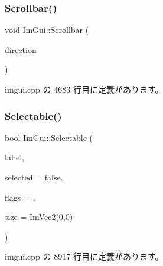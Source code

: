 \mbox{\label{namespace_im_gui_abf1d7a83c5f0a555bbe7f831b0319c8a}} 
\subsubsection{\texorpdfstring{Scrollbar()}{Scrollbar()}}
{\footnotesize\ttfamily void Im\+Gui\+::\+Scrollbar (\begin{DoxyParamCaption}\item[{\mbox{\hyperlink{imgui__internal_8h_a86d7bb2ee8297d38b131d8ea7e6430c6}{Im\+Gui\+Layout\+Type}}}]{direction }\end{DoxyParamCaption})}



 imgui.\+cpp の 4683 行目に定義があります。

\mbox{\label{namespace_im_gui_af98575238bda183a523df19fb447af60}} 
\subsubsection{\texorpdfstring{Selectable()}{Selectable()}\hspace{0.1cm}{\footnotesize\ttfamily [1/2]}}
{\footnotesize\ttfamily bool Im\+Gui\+::\+Selectable (\begin{DoxyParamCaption}\item[{const char $\ast$}]{label,  }\item[{bool}]{selected = {\ttfamily false},  }\item[{\mbox{\hyperlink{imgui_8h_aab0fe56421d75949dedfbfbbaa674b6b}{Im\+Gui\+Selectable\+Flags}}}]{flags = {},  }\item[{const \mbox{\hyperlink{struct_im_vec2}{Im\+Vec2}} \&}]{size = {\ttfamily \mbox{\hyperlink{struct_im_vec2}{Im\+Vec2}}(0,0)} }\end{DoxyParamCaption})}



 imgui.\+cpp の 8917 行目に定義があります。

\mbox{\label{namespace_im_gui_a9229a9c3c304ffc0c98ffe2ee4ff5e40}} 
